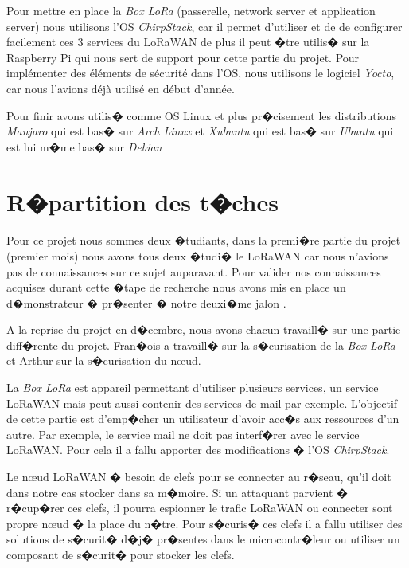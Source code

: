 \documentclass[a4paper, titlepage,12pt]{report}
\begin{document}
Pour mettre en place la \textit{Box LoRa} (passerelle, network server et application server) nous utilisons l'OS \textit{ChirpStack}, car il permet d'utiliser et de de configurer facilement ces 3 services du LoRaWAN de plus il peut �tre utilis� sur la Raspberry Pi qui nous sert de support pour cette partie du projet. Pour implémenter des éléments de sécurité dans l'OS, nous utilisons le logiciel \textit{Yocto}, car nous l'avions déjà utilisé en début d'année.

Pour finir avons utilis� comme OS Linux et plus pr�cisement les distributions \textit{Manjaro} qui est bas� sur \textit{Arch Linux} et \textit{Xubuntu} qui est bas� sur \textit{Ubuntu} qui est lui m�me bas� sur \textit{Debian}

\section{R�partition des t�ches}
\paragraph{}
Pour ce projet nous sommes deux �tudiants, dans la premi�re partie du projet (premier mois) nous avons tous deux �tudi� le LoRaWAN car nous n'avions pas de connaissances sur ce sujet auparavant. Pour valider nos connaissances acquises durant cette �tape de recherche nous avons mis en place un d�monstrateur � pr�senter � notre deuxi�me jalon .

A la reprise du projet en d�cembre, nous avons chacun travaill� sur une partie diff�rente du projet. Fran�ois a travaill� sur la s�curisation de la \textit{Box LoRa} et Arthur sur la s�curisation du n\oe{}ud.

La \textit{Box LoRa} est appareil permettant d'utiliser plusieurs services, un service LoRaWAN mais peut aussi contenir des services de mail par exemple. L'objectif de cette partie est d'emp�cher un utilisateur d'avoir acc�s aux ressources d'un autre. Par exemple, le service mail ne doit pas interf�rer avec le service LoRaWAN. Pour cela il a fallu apporter des modifications � l'OS \textit{ChirpStack}.

Le n\oe{}ud LoRaWAN � besoin de clefs pour se connecter au r�seau, qu'il doit dans notre cas stocker dans sa m�moire. Si un attaquant parvient � r�cup�rer ces clefs, il pourra  espionner le trafic LoRaWAN ou connecter sont propre n\oe{}ud � la place du n�tre. Pour s�curis� ces clefs il a fallu utiliser des solutions de s�curit� d�j� pr�sentes dans le microcontr�leur ou utiliser un composant de s�curit� pour stocker les clefs.
\end{document}
